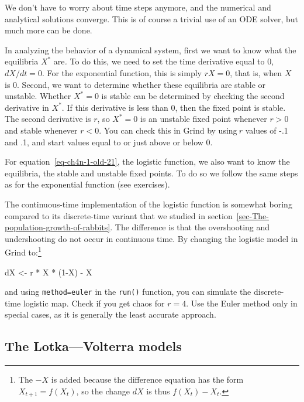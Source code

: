 \documentclass[
  a4paper,
  DIV=11,
  numbers=noendperiod,
  oneside]{scrreprt}
\newenvironment{Shaded}{}{}
\newcommand{\DecValTok}[1]{\textcolor[rgb]{0.00,0.36,0.77}{#1}}
\newcommand{\NormalTok}[1]{\textcolor[rgb]{0.14,0.16,0.18}{#1}}
\newcommand{\OtherTok}[1]{\textcolor[rgb]{0.44,0.26,0.76}{#1}}
\newcommand{\SpecialCharTok}[1]{\textcolor[rgb]{0.00,0.36,0.77}{#1}}
\begin{document}
We don't have to worry about time steps anymore, and the numerical and
analytical solutions converge. This is of course a trivial use of an ODE
solver, but much more can be done.

In analyzing the behavior of a dynamical system, first we want to know
what the equilibria \(X^{*}\) are\emph{.} To do this, we need to set the
time derivative equal to 0, \(dX/dt = 0\). For the exponential function,
this is simply \(rX = 0\), that is, when \(X\) is 0. Second, we want to
determine whether these equilibria are stable or unstable. Whether
\(X^{*}=0\) is stable can be determined by checking the second
derivative in \(X^{*}\). If this derivative is less than 0, then the
fixed point is stable. The second derivative is \(r\), so \(X^{*} = 0\)
is an unstable fixed point whenever \(r > 0\) and stable whenever
\(r < 0\). You can check this in Grind by using\(\ r\) values of -.1 and
.1, and start values equal to or just above or below 0.

For equation~\ref{eq-ch4n-1-old-21}, the logistic function, we also want
to know the equilibria, the stable and unstable fixed points. To do so
we follow the same steps as for the exponential function (see
exercises).

The continuous-time implementation of the logistic function is somewhat
boring compared to its discrete-time variant that we studied in
section~\ref{sec-The-population-growth-of-rabbits}. The difference is
that the overshooting and undershooting do not occur in continuous time.
By changing the logistic model in Grind to:\footnote{The \(-X\) is added
  because the difference equation has the form \(X_{t + 1} = f(X_{t})\),
  so the change \(dX\) is thus \(f(X_{t})-X_{t}\).}

\begin{Shaded}
\begin{Highlighting}[]
\NormalTok{dX }\OtherTok{\textless{}{-}}\NormalTok{ r }\SpecialCharTok{*}\NormalTok{ X }\SpecialCharTok{*}\NormalTok{ (}\DecValTok{1}\SpecialCharTok{{-}}\NormalTok{X) }\SpecialCharTok{{-}}\NormalTok{ X }
\end{Highlighting}
\end{Shaded}

and using \texttt{method=\textquotesingle{}euler\textquotesingle{}} in
the \texttt{run()} function, you can simulate the discrete-time logistic
map. Check if you get chaos for \(r = 4\). Use the Euler method only in
special cases, as it is generally the least accurate approach.

\subsection{The Lotka---Volterra
models}\label{sec-The-LotkaVolterra-models}
\end{document}
